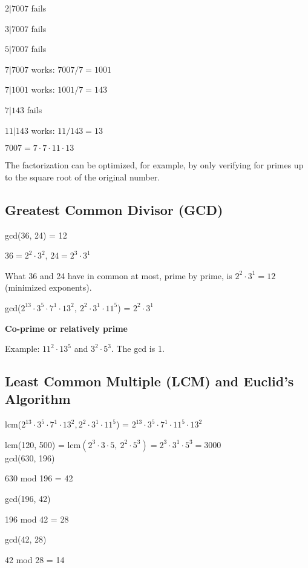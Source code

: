 \documentclass[english,openany]{book}
\begin{document}
    $2|7007$ fails

    $3|7007$ fails

    $5|7007$ fails

    $7|7007$ works: $7007/7 = 1001$

    $7|1001$ works: $1001/7 = 143$

    $7|143$ fails

    $11|143$ works: $11/143 = 13$

    $7007 = 7 \cdot 7 \cdot 11 \cdot 13$

    The factorization can be optimized, for example, by only verifying for primes up to the square root of the original number.\\

    \subsection{Greatest Common Divisor (GCD)}

    gcd(36, 24) = 12

    $36 = 2^2 \cdot 3^2$, $24 = 2^3 \cdot 3^1$

    What 36 and 24 have in common at most, prime by prime, is $2^2 \cdot 3^1 = 12$ (minimized exponents).

    gcd($2^{13} \cdot 3^5 \cdot 7^1 \cdot 13^2,\ 2^2 \cdot 3^1 \cdot 11^5$) = $2^2 \cdot 3^1$

     \textbf{Co-prime or relatively prime}

     Example: $11^2 \cdot 13^5$ and $3^2 \cdot 5^3$. The gcd is 1.

     \subsection{Least Common Multiple (LCM) and Euclid's Algorithm}

     lcm($2^{13} \cdot 3^5 \cdot 7^1 \cdot 13^2, 2^2 \cdot 3^1 \cdot 11^5$) = $2^{13} \cdot 3^5 \cdot 7^1 \cdot 11^5 \cdot 13^2$

     lcm(120, 500) = lcm$(2^3 \cdot 3 \cdot 5,\ 2^2 \cdot 5^3) = 2^3 \cdot 3^1 \cdot 5^3 = 3000$\\

    gcd(630, 196)

    630 mod 196 = 42

    gcd(196, 42)

    196 mod 42 = 28

    gcd(42, 28)

    42 mod 28 = 14
\end{document}

